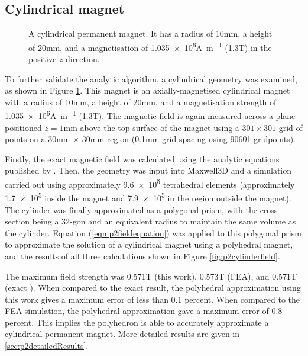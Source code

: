 \subsection{Cylindrical magnet}\label{sec:p2cylindricalmagnet}
\begin{figure}
	\centering
	
	\caption{A cylindrical permanent magnet. It has a radius of 10\si{\milli\metre}, a height of 20\si{\milli\metre}, and a magnetisation of \num{1.035e6}\si{\ampere\per\metre} (1.3\si{\tesla}) in the positive \(z\) direction.}
	\label{fig:p2cylinder}
\end{figure}
To further validate the analytic algorithm, a cylindrical geometry was examined, as shown in Figure \ref{fig:p2cylinder}. This magnet is an axially-magnetised cylindrical magnet with a radius of 10\si{\milli\metre}, a height of 20\si{\milli\metre}, and a magnetisation strength of \num{1.035e6}\si{\ampere\per\metre} (1.3\si{\tesla}). The magnetic field is again measured across a plane positioned \(z = 1\)\si{\milli\metre} above the top surface of the magnet using a \(301\times301\) grid of points on a 30\si{\milli\metre} \(\times\) 30\si{\milli\metre} region (0.1\si{\milli\metre} grid spacing using 90601 gridpoints).

Firstly, the exact magnetic field was calculated using the analytic equations published by \textcite{Caciagli2018}. Then, the geometry was input into Maxwell3D and a simulation carried out using approximately \num{9.6e5} tetrahedral elements (approximately \num{1.7e5} inside the magnet and \num{7.9e5} in the region outside the magnet). The cylinder was finally approximated as a polygonal prism, with the cross section being a 32-gon and an equivalent radius to maintain the same volume as the cylinder. Equation (\ref{eqn:p2fieldequation}) was applied to this polygonal prism to approximate the solution of a cylindrical magnet using a polyhedral magnet, and the results of all three calculations shown in Figure \ref{fig:p2cylinderfield}.

The maximum field strength was 0.571\si{\tesla} (this work), 0.573\si{\tesla} (FEA), and 0.571\si{\tesla} (exact \cite{Caciagli2018}). When compared to the exact result, the polyhedral approximation using this work gives a maximum error of less than 0.1 percent. When compared to the FEA simulation, the polyhedral approximation gave a maximum error of 0.8 percent. This implies the polyhedron is able to accurately approximate a cylindrical permanent magnet. More detailed results are given in \ref{sec:p2detailedResults}.

